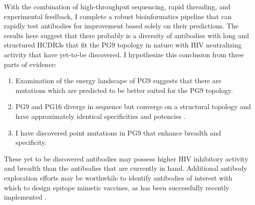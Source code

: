 With the combination of high-throughput sequencing, rapid threading, and experimental feedback, I complete a robust bioinformatics pipeline that can rapidly test antibodies for improvement based solely on their \silico predictions. The results here suggest that there probably is a diversity of antibodies with long and structured HCDR3s that fit the PG9 topology in nature with HIV neutralizing activity that have yet-to-be discovered. I hypothesize this conclusion from three parts of evidence:
\begin{enumerate}
\item Examination of the energy landscape of PG9 suggests that there are mutations which are predicted to be better suited for the PG9 topology.
\item PG9 and PG16 diverge in sequence but converge on a structural topology and have approximately identical specificities and potencies \citep{McLellan:2011dg,Pejchal:2010fp,Pancera:2010hh}.
\item I have discovered point mutations in PG9 that enhance breadth and specificity.
\end{enumerate}
These yet to be discovered antibodies may possess higher HIV inhibitory activity and breadth than the antibodies that are currently in hand. Additional antibody exploration efforts may be worthwhile to identify antibodies of interest with which to design epitope mimetic vaccines, as has been successfully recently implemented \citep{Correia:2014jp,Jardine:2013hb}.



